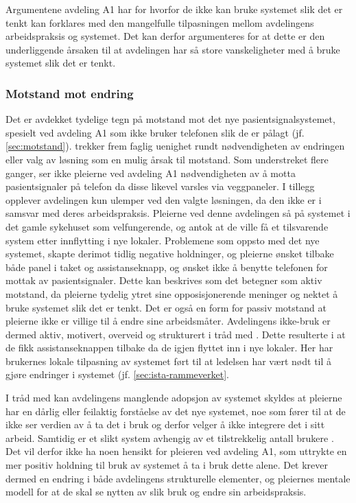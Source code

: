 \noindent
Argumentene avdeling A1 har for hvorfor de ikke kan bruke systemet slik det er tenkt kan forklares med den mangelfulle tilpasningen mellom avdelingens arbeidspraksis og systemet. Det kan derfor argumenteres for at dette er den underliggende årsaken til at avdelingen har så store vanskeligheter med å bruke systemet slik det er tenkt. 

\subsubsection{Motstand mot endring}
Det er avdekket tydelige tegn på motstand mot det nye pasientsignalsystemet, spesielt ved avdeling A1 som ikke bruker telefonen slik de er pålagt (jf. \ref{sec:motstand}). \citet{Jacobsen12} trekker frem faglig uenighet rundt nødvendigheten av endringen eller valg av løsning som en mulig årsak til motstand. Som understreket flere ganger, ser ikke pleierne ved avdeling A1 nødvendigheten av å motta pasientsignaler på telefon da disse likevel varsles via veggpaneler. I tillegg opplever avdelingen kun ulemper ved den valgte løsningen, da den ikke er i samsvar med deres arbeidspraksis. Pleierne ved denne avdelingen så på systemet i det gamle sykehuset som velfungerende, og antok at de ville få et tilsvarende system etter innflytting i nye lokaler. Problemene som oppsto med det nye systemet, skapte derimot tidlig negative holdninger, og pleierne ønsket tilbake både panel i taket og assistanseknapp, og ønsket ikke å benytte telefonen for mottak av pasientsignaler. Dette kan beskrives som det \citet{Lapointe05} betegner som aktiv motstand, da pleierne tydelig ytret sine opposisjonerende meninger og nektet å bruke systemet slik det er tenkt. Det er også en form for passiv motstand at pleierne ikke er villige til å endre sine arbeidsmåter. Avdelingens ikke-bruk er dermed aktiv, motivert, overveid og strukturert i tråd med \citet{Satchell09}. Dette resulterte i at de fikk assistanseknappen tilbake da de igjen flyttet inn i nye lokaler. Her har brukernes lokale tilpasning av systemet ført til at ledelsen har vært nødt til å gjøre endringer i systemet (jf. \ref{sec:ista-rammeverket}. 

\noindent
I tråd med \citet{Orlikowski92} kan avdelingens manglende adopsjon av systemet skyldes at pleierne har en dårlig eller feilaktig forståelse av det nye systemet, noe som fører til at de ikke ser verdien av å ta det i bruk og derfor velger å ikke integrere det i sitt arbeid. Samtidig er et slikt system avhengig av et tilstrekkelig antall brukere \citep{Ackermann00}. Det vil derfor ikke ha noen hensikt for pleieren ved avdeling A1, som uttrykte en mer positiv holdning til bruk av systemet å ta i bruk dette alene. Det krever dermed en endring i både avdelingens strukturelle elementer, og pleiernes mentale modell for at de skal se nytten av slik bruk og endre sin arbeidspraksis.

